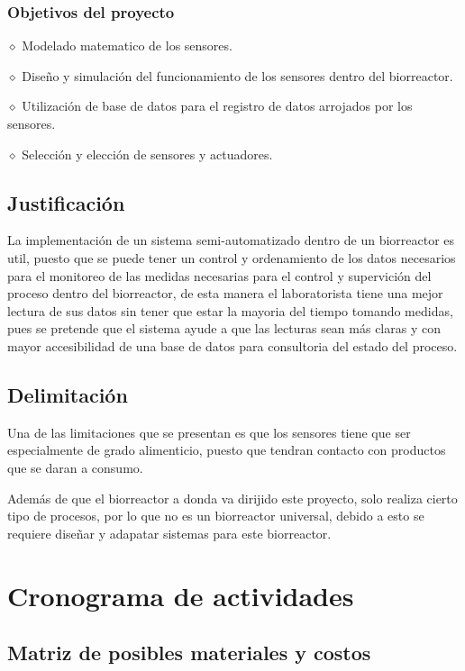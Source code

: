 \documentclass[letter,operight,12pt,spanish]{report}
\begin{document}
\subsubsection{Objetivos del proyecto}

$\diamond$ Modelado matematico de los sensores.

$\diamond$ Dise\~no y simulaci\'on del funcionamiento de los sensores dentro del biorreactor.

$\diamond$ Utilizaci\'on de base de datos para el registro de datos arrojados por los sensores.

$\diamond$ Selecci\'on y elecci\'on de sensores y actuadores.

\subsection{Justificaci\'on}

La implementaci\'on de un sistema semi-automatizado dentro de un biorreactor es util, puesto que se puede tener un control y ordenamiento de los datos necesarios para el monitoreo de las medidas necesarias para el control y supervici\'on del proceso dentro del biorreactor, de esta manera el laboratorista tiene una mejor lectura de sus datos sin tener que estar la mayoria del tiempo tomando medidas, pues se pretende que el sistema ayude a que las lecturas sean m\'as claras y con mayor accesibilidad de una base de datos para consultoria del estado del proceso.

\subsection{Delimitaci\'on}

Una de las limitaciones que se presentan es que los sensores tiene que ser especialmente de grado alimenticio, puesto que tendran contacto con productos que se daran a consumo.

Adem\'as de que el biorreactor a donda va dirijido este proyecto, solo realiza cierto tipo de procesos, por lo que no es un biorreactor universal, debido a esto se requiere dise\~nar y adapatar sistemas para este biorreactor.

\section{Cronograma de actividades}

\subsection{Matriz de posibles materiales y costos}
\end{document}
